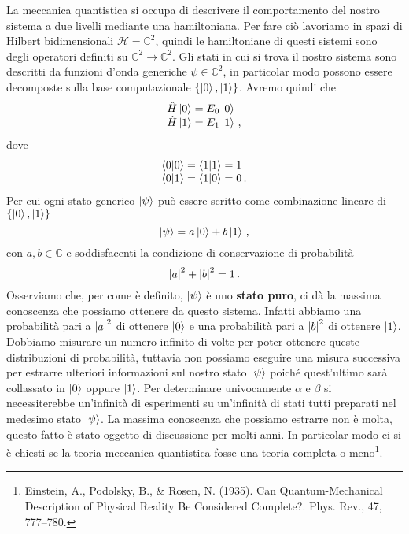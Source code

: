 La meccanica quantistica si occupa di descrivere il comportamento del nostro sistema a due livelli mediante una hamiltoniana. Per fare ciò lavoriamo in spazi di Hilbert bidimensionali $\mathcal{H}=\mathbb{C}^2$, quindi le hamiltoniane di questi sistemi sono degli operatori definiti su $\mathbb{C}^2 \rightarrow \mathbb{C}^2$. Gli stati in cui si trova il nostro sistema sono descritti da funzioni d'onda generiche $\psi \in \mathbb{C}^2$, in particolar modo possono essere decomposte sulla base computazionale $\{\ket 0, \ket 1\}$. Avremo quindi che 
\begin{equation*}
    \begin{array}{l}
        \hat H \ket 0 = E_0 \ket 0 \\
        \hat H \ket 1 = E_1 \ket 1 \, ,
    \end{array}
\end{equation*}
dove
\begin{equation*}
    \begin{array}{l}
        \ip{0}{0}=\ip{1}{1}=1 \\
        \ip{0}{1}=\ip{1}{0}=0 \, .
    \end{array}
\end{equation*}
Per cui ogni stato generico $\ket \psi$ può essere scritto come combinazione lineare di $\{\ket 0, \ket 1\}$
\begin{equation*}
    \ket \psi = a \ket 0 + b \ket 1 \, ,
\end{equation*}
con $a,b \in \mathbb{C}$ e soddisfacenti la condizione di conservazione di probabilità
\begin{equation*}
    \abs{a}^2+\abs{b}^2=1 \, .
\end{equation*}
Osserviamo che, per come è definito, $\ket \psi$ è uno \textbf{stato puro}, ci dà la massima conoscenza che possiamo ottenere da questo sistema. Infatti abbiamo una probabilità pari a $\abs{a}^2$ di ottenere $\ket 0$ e una probabilità pari a $\abs{b}^2$ di ottenere $\ket 1$. Dobbiamo misurare un numero infinito di volte per poter ottenere queste distribuzioni di probabilità, tuttavia non possiamo eseguire una misura successiva per estrarre ulteriori informazioni sul nostro stato $\ket \psi$ poiché quest'ultimo sarà collassato in $\ket 0$ oppure $\ket 1$. Per determinare univocamente $\alpha$ e $\beta$ si necessiterebbe un'infinità di esperimenti su un'infinità di stati tutti preparati nel medesimo stato $\ket \psi$. La massima conoscenza che possiamo estrarre non è molta, questo fatto è stato oggetto di discussione per molti anni. In particolar modo ci si è chiesti se la teoria meccanica quantistica fosse una teoria completa o meno\footnote{Einstein, A., Podolsky, B., \& Rosen, N. (1935). Can Quantum-Mechanical Description of Physical Reality Be Considered Complete?. Phys. Rev., 47, 777–780.}.\\
